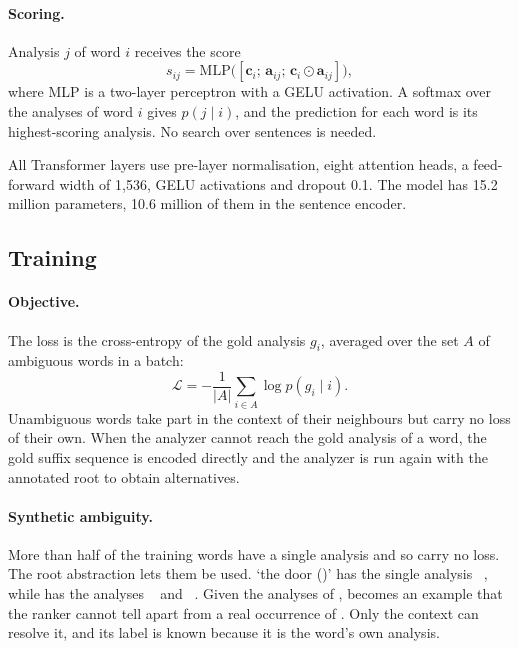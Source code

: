 \paragraph{Scoring.}
Analysis $j$ of word $i$ receives the score
\begin{equation}
s_{ij} = \mathrm{MLP}\big([\mathbf{c}_i;\, \mathbf{a}_{ij};\, \mathbf{c}_i \odot \mathbf{a}_{ij}]\big),
\end{equation}
where MLP is a two-layer perceptron with a GELU activation. A softmax over the analyses of word $i$ gives $p(j \mid i)$, and the prediction for each word is its highest-scoring analysis. No search over sentences is needed.

All Transformer layers use pre-layer normalisation, eight attention heads, a feed-forward width of 1,536, GELU activations and dropout 0.1. The model has 15.2 million parameters, 10.6 million of them in the sentence encoder.

\subsection{Training}
\label{sec:training}

\paragraph{Objective.}
The loss is the cross-entropy of the gold analysis $g_i$, averaged over the set $A$ of ambiguous words in a batch:
\begin{equation}
\mathcal{L} = -\frac{1}{|A|} \sum_{i \in A} \log p(g_i \mid i).
\end{equation}
Unambiguous words take part in the context of their neighbours but carry no loss of their own. When the analyzer cannot reach the gold analysis of a word, the gold suffix sequence is encoded directly and the analyzer is run again with the annotated root to obtain alternatives.

\paragraph{Synthetic ambiguity.}
More than half of the training words have a single analysis and so carry no loss. The root abstraction lets them be used.  `the door ()' has the single analysis ~, while  has the analyses ~ and ~. Given the analyses of ,  becomes an example that the ranker cannot tell apart from a real occurrence of . Only the context can resolve it, and its label is known because it is the word's own analysis.

